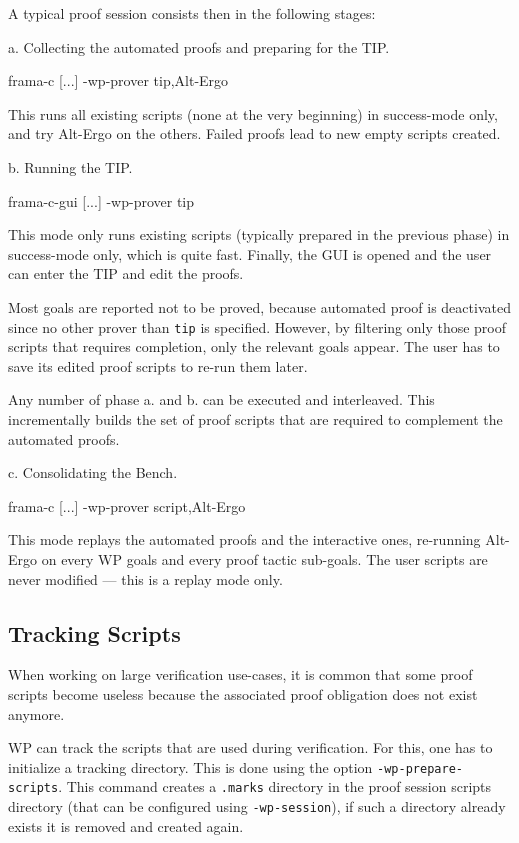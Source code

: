 \clearpage
A typical proof session consists then in the following stages:

a. Collecting the automated proofs and preparing for the TIP.
\begin{logs}
  frama-c [...] -wp-prover tip,Alt-Ergo
\end{logs}

This runs all existing scripts (none at the very beginning) in success-mode only, and try Alt-Ergo on the others. Failed proofs lead to new empty scripts created.

b. Running the TIP.
\begin{logs}
  frama-c-gui [...] -wp-prover tip
\end{logs}

This mode only runs existing scripts (typically prepared in the previous phase) in success-mode only, which is quite fast. Finally, the GUI is opened and the user can enter the TIP and edit the proofs.

Most goals are reported not to be proved, because automated proof is deactivated since no other prover than \verb+tip+ is specified. However, by filtering only those proof scripts that requires completion, only the relevant goals appear. The user has to save its edited proof scripts to re-run them later.

Any number of phase a. and b. can be executed and interleaved. This incrementally builds the set of proof scripts that are required to complement the automated proofs.

c. Consolidating the Bench.
\begin{logs}
  frama-c [...] -wp-prover script,Alt-Ergo
\end{logs}

This mode replays the automated proofs and the interactive ones, re-running Alt-Ergo on every \textsf{WP} goals and every proof tactic sub-goals. The user scripts are never modified — this is a replay mode only.

\subsection{Tracking Scripts}

When working on large verification use-cases, it is common that some proof scripts
become useless because the associated proof obligation does not exist anymore.

WP can track the scripts that are used during verification. For this, one has to
initialize a tracking directory. This is done using the option
\verb+-wp-prepare-scripts+. This command creates a \verb+.marks+ directory in the
proof session scripts directory (that can be configured using \verb+-wp-session+),
if such a directory already exists it is removed and created again.


